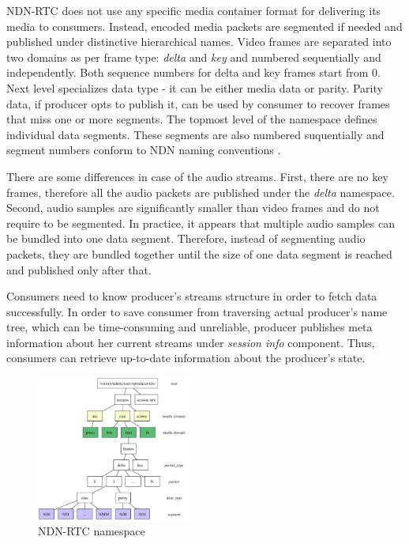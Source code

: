 \documentclass{icn/sig-alternate-2012} %
\newcommand{\ndnrtcName}{NDN-RTC} %
\begin{document}

\ndnrtcName{} does not use any specific media container format for delivering its media to consumers. Instead, encoded media packets are segmented if needed and published under distinctive hierarchical names. Video frames are separated into two domains as per frame type: \textit{delta} and \textit{key} and numbered sequentially and independently. Both sequence numbers for delta and key frames start from 0. Next level specializes data type - it can be either media data or parity. Parity data, if producer opts to publish it, can be used by consumer to recover frames that miss one or more segments. The topmost level of the namespace defines individual data segments. These segments are also numbered suquentially and segment numbers conform to NDN naming conventions \cite{ndn_naming}.

There are some differences in case of the audio streams. First, there are no key frames, therefore all the audio packets are published under the \textit{delta} namespace. Second, audio samples are significantly smaller than video frames and do not require to be segmented. In practice, it appears that multiple audio samples can be bundled into one data segment. Therefore, instead of segmenting audio packets, they are bundled together until the size of one data segment is reached and published only after that.

Consumers need to know producer's streams structure in order to fetch data successfully. In order to save consumer from traversing actual producer's name tree, which can be time-consuming and unreliable, producer publishes meta information about her current streams under \textit{session info} component. Thus, consumers can retrieve up-to-date information about the producer's state.

\begin{figure}[t!]
\centering
\includegraphics[width=0.45\textwidth]{namespace}
\caption{\ndnrtcName{} namespace}
\label{fig:namespace}
\end{figure}
\end{document}
